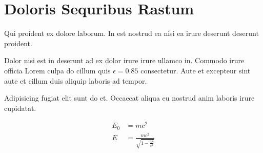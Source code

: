 \documentclass[12pt]{article}
\begin{document}
\maketitle
\clearpage

\section{Doloris Sequribus Rastum}
\label{sec:1}

Qui proident ex dolore laborum. In est nostrud ea nisi ea irure deserunt deserunt proident.

Dolor nisi est in deserunt ad ex dolor irure irure ullamco in. Commodo irure officia Lorem
culpa do cillum quis $\epsilon = 0.85$ consectetur. Aute et excepteur sint aute et cillum 
duis aliquip laboris ad tempor.

Adipisicing fugiat elit sunt do et. Occaecat aliqua eu nostrud anim laboris irure 
cupidatat.


\begin{align}
	E_0 & = mc^2 \\
	E   & = \frac{mc^2}{\sqrt{1-\frac{v^2}{c^2}}}
\end{align}
\end{document}
